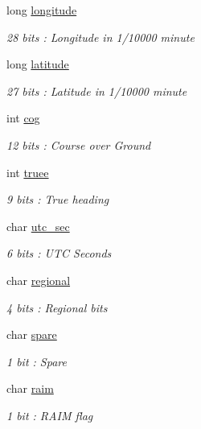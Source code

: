 \begin{DoxyCompactItemize}
long \mbox{\hyperlink{structaismsg__1_a97c06b7dcfa538fdbf6eddf99cbbfb29}{longitude}}
\begin{DoxyCompactList}\small\item\em 28 bits \+: Longitude in 1/10000 minute \end{DoxyCompactList}\item 
long \mbox{\hyperlink{structaismsg__1_ac084e306c9aca5fce13c4881fa299453}{latitude}}
\begin{DoxyCompactList}\small\item\em 27 bits \+: Latitude in 1/10000 minute \end{DoxyCompactList}\item 
int \mbox{\hyperlink{structaismsg__1_a5d51c80074e1ed65fc01ee0b728e6b0b}{cog}}
\begin{DoxyCompactList}\small\item\em 12 bits \+: Course over Ground \end{DoxyCompactList}\item 
int \mbox{\hyperlink{structaismsg__1_ae98ca0e4721cb6a8e796079581e44cf7}{truee}}
\begin{DoxyCompactList}\small\item\em 9 bits \+: True heading \end{DoxyCompactList}\item 
char \mbox{\hyperlink{structaismsg__1_a65eebaa7af12655f55f92e9d3adabb0c}{utc\+\_\+sec}}
\begin{DoxyCompactList}\small\item\em 6 bits \+: U\+TC Seconds \end{DoxyCompactList}\item 
char \mbox{\hyperlink{structaismsg__1_ab3f8425a50c3480d175354e2438e9e04}{regional}}
\begin{DoxyCompactList}\small\item\em 4 bits \+: Regional bits \end{DoxyCompactList}\item 
char \mbox{\hyperlink{structaismsg__1_a45d0b9de3cee87e94e8bb33b82808039}{spare}}
\begin{DoxyCompactList}\small\item\em 1 bit \+: Spare \end{DoxyCompactList}\item 
char \mbox{\hyperlink{structaismsg__1_ae3afec956036ee615d86fc8deda89858}{raim}}
\begin{DoxyCompactList}\small\item\em 1 bit \+: R\+A\+IM flag \end{DoxyCompactList}\item 

\end{DoxyCompactItemize}
